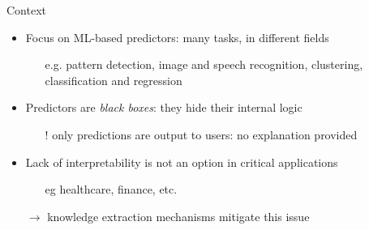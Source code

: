 \documentclass[presentation]{beamer}
\begin{document}
\begin{frame}[c]{Context}
    
    \vfill
    \begin{itemize}
        \item Focus on ML-based predictors:  many tasks, in different fields
        \begin{itemize}
            \item[e.g.] pattern detection, image and speech recognition, clustering, classification and regression
        \end{itemize}
        
        \vfill
        
        \item Predictors are \emph{black boxes}: they hide their internal logic 
        \begin{itemize}
            \item[!] only predictions are output to users: no \alert{explanation} provided
        \end{itemize}
        
        \vfill
        
        \item Lack of interpretability is not an option in critical applications
        \begin{itemize}
        	\item[eg] healthcare, finance, etc.
        \end{itemize}
    
    	\vfill
        
        \item[$\rightarrow$] knowledge extraction mechanisms mitigate this issue
        
    \end{itemize}
\end{frame}
\end{document}
